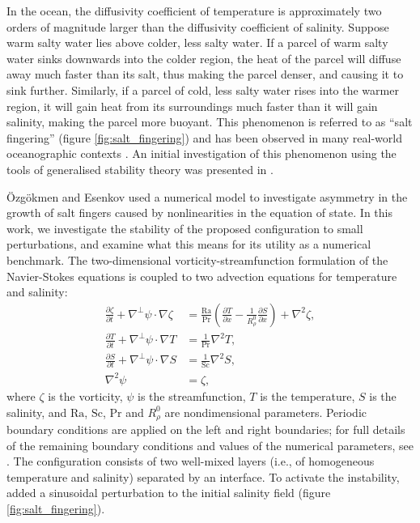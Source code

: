\documentclass{siamltex}
\begin{document}
In the ocean, the diffusivity coefficient of temperature is approximately two orders of magnitude larger than
the diffusivity coefficient of salinity. Suppose warm salty water lies above colder, less salty water. If a parcel of warm salty water sinks downwards
into the colder region, the heat of the parcel will diffuse away much faster than its salt, thus making the parcel
denser, and causing it to sink further. Similarly, if a parcel of cold, less salty water rises into the warmer
region, it will gain heat from its surroundings much faster than it will gain salinity, making the parcel more
buoyant. This phenomenon is referred to as ``salt fingering'' \cite{stern1960} (figure \ref{fig:salt_fingering}) and has been observed in many
real-world oceanographic contexts \cite{turner1985}. An initial investigation of this phenomenon using the tools
of generalised stability theory was presented in \cite{eisenman2005}.

\newcommand{\Ra}{\textrm{Ra}}
\newcommand{\Sc}{\textrm{Sc}}
\renewcommand{\Pr}{\textrm{Pr}}

\"Ozg\"okmen and Esenkov \cite{ozgokmen1998b} used a numerical model to investigate asymmetry in the growth of salt fingers caused by
nonlinearities in the equation of state. In this work, we investigate the stability of the
proposed configuration to small perturbations, and examine what this means for its utility as a
numerical benchmark. The two-dimensional vorticity-streamfunction formulation of the
Navier-Stokes equations is coupled to two advection equations for temperature and salinity:
\begin{align}
  \frac{\partial \zeta}{\partial t} + \nabla^{\perp} \psi \cdot \nabla \zeta &= \frac{\Ra}{\Pr}\left(\frac{\partial
T}{\partial x} - \frac{1}{R_{\rho}^0} \frac{\partial S}{\partial x}\right) + \nabla^2 \zeta, \\
\frac{\partial T}{\partial t} + \nabla^{\perp} \psi \cdot \nabla T &= \frac{1}{\Pr} \nabla^2 T, \\
          \frac{\partial S}{\partial t} + \nabla^{\perp} \psi \cdot \nabla S &= \frac{1}{\Sc} \nabla^2 S, \\
                                       \nabla^2 \psi &= \zeta,
\end{align}
where $\zeta$ is the vorticity, $\psi$ is the streamfunction, $T$ is the temperature, $S$ is the
salinity, and $\Ra$, $\Sc$, $\Pr$ and ${R_{\rho}^0}$ are nondimensional parameters.
Periodic boundary conditions are applied on the left and right boundaries; for full details of the
remaining boundary conditions and values of the numerical parameters, see \cite{ozgokmen1998b}. The
configuration consists of two well-mixed layers (i.e., of homogeneous temperature and salinity) separated
by an interface. To activate the instability, \cite{ozgokmen1998b} added a
sinusoidal perturbation to the initial salinity field (figure \ref{fig:salt_fingering}). 
\end{document}
